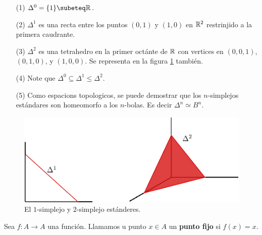 \begin{example}\label{exmp_2}
    \begin{enumerate}
        \item[(1)] $\Delta^0=\{1\} \subeteq \R$.

        \item[(2)] $\Delta^1$ es una recta entre los puntos $(0,1)$ y $(1,0)$ en
            $\mathbb{R}^2$ restrinjido a la primera caudrante.

        \item[(3)] $\Delta^2$ es una tetrahedro en la primer oct\'ante de  $\mathbb{R}$
            con vertices en  $(0,0,1)$, $(0,1,0)$, y $(1,0,0)$. Se representa en
            la figura \ref{fig_1} tambi\'en.

        \item[(4)] Note que $\Delta^0 \subseteq \Delta^1 \leq \Delta^2$.

        \item[(5)] Como espacions topologicos, se puede demostrar que los
            $n$-simplejos est\'andares son homeomorfo a los  $n$-bolas. Es decir
             $\Delta^n \simeq B^n$.
    \end{enumerate}
\end{example}

\begin{figure}[h]
    \centering
    \includegraphics[scale=0.5]{Figures/standaard_simplices.eps}
    \caption{El $1$-simplejo y  $2$-simplejo est\'anderes.}
    \label{fig_1}
\end{figure}

\begin{definition}
    Sea $f:A \rightarrow A$ una funci\'on. Llamamos u punto $x \in A$ un
    \textbf{punto fijo} si $f(x)=x$.
\end{definition}

